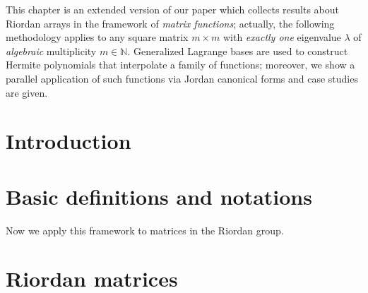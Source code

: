 


This chapter is an extended version of our paper
\citep{Merlini:Nocentini:matrices:functions} which collects results about
Riordan arrays in the framework of \textit{matrix functions};  actually,
the following methodology applies to any square matrix $m\times m$ with
\textit{exactly one} eigenvalue $\lambda$ of \textit{algebraic}
multiplicity $m \in\mathbb{N}$.  Generalized Lagrange bases are used to
construct Hermite polynomials that interpolate a family of functions;
moreover, we show a parallel application of such functions via Jordan
canonical forms and case studies are given.


\section{Introduction}

\label{sec:matrices:functions:introduction}


\section{Basic definitions and notations}



Now we apply this framework to matrices in the Riordan group.

\section{Riordan matrices}



\iffalse %



\subsection{A component matrices characterization of Hermite interpolating polynomials}


\fi

